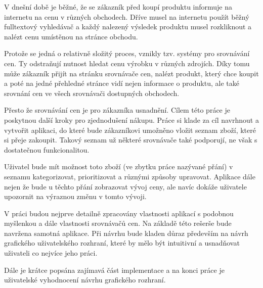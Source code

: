 \begin{introduction}
V dnešní době je běžné, že se zákazník před koupí produktu informuje na internetu na cenu v různých obchodech. Dříve musel na internetu použít běžný fulltextový vyhledávač a každý nalezený výsledek produktu musel rozkliknout a nalézt cenu umístěnou na stránce obchodu.

Protože se jedná o relativně složitý proces, vznikly tzv. systémy pro srovnávání cen. Ty odstraňují nutnost hledat cenu výrobku v různých zdrojích. Díky tomu může zákazník přijít na stránku srovnávače cen, nalézt produkt, který chce koupit a poté na jedné přehledné stránce vidí nejen informace o produktu, ale také srovnání cen ve všech srovnávači dostupných obchodech.

Přesto že srovnávání cen je pro zákazníka usnadnění. Cílem této práce je poskytnou další kroky pro zjednodušení nákupu. Práce si klade za cíl navrhnout a vytvořit aplikaci, do které bude zákazníkovi umožněno vložit seznam zboží, které si přeje zakoupit. Takový seznam už některé srovnávače také podporují, ne však s dostatečnou funkcionalitou.

Uživatel bude mít možnost toto zboží (ve zbytku práce nazývané přání) v seznamu kategorizovat, prioritizovat a různými způsoby upravovat. Aplikace dále nejen že bude u těchto přání zobrazovat vývoj ceny, ale navíc dokáže uživatele upozornit na výraznou změnu v tomto vývoji.

V práci budou nejprve detailně zpracovány vlastnosti aplikací s podobnou myšlenkou a dále vlastnosti srovnávačů cen. Na základě této rešerše bude navržena samotná aplikace. Při návrhu bude kladen důraz především na návrh grafického uživatelského rozhraní, které by mělo být intuitivní a usnadňovat uživateli co nejvíce jeho práci.

Dále je krátce popsána zajímavá část implementace a na konci práce je uživatelské vyhodnocení návrhu grafického rozhraní.
\end{introduction}